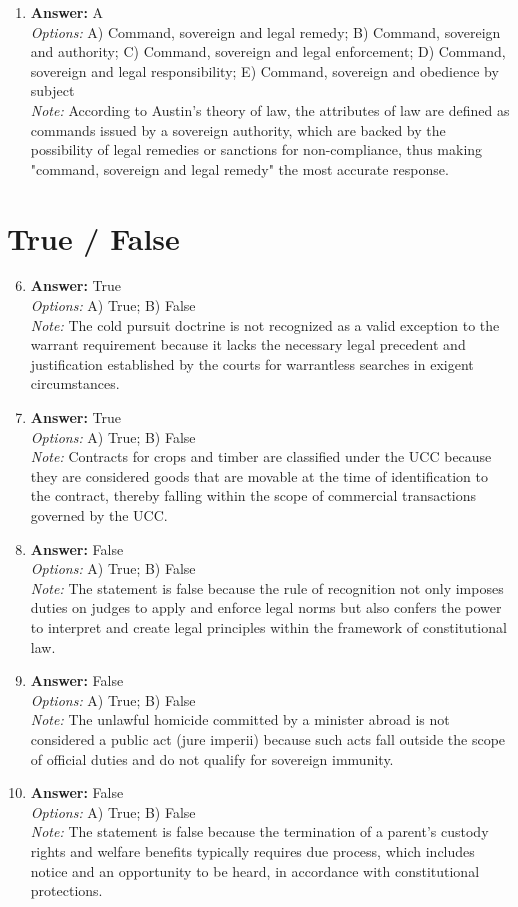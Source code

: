 \documentclass[12pt]{article}
\begin{document}
\begin{enumerate}[label=\arabic*.]
\item \textbf{Answer:} A
\\ \textit{Options:} A) Command, sovereign and legal remedy; B) Command, sovereign and authority; C) Command, sovereign and legal enforcement; D) Command, sovereign and legal responsibility; E) Command, sovereign and obedience by subject
\\ \textit{Note:} According to Austin's theory of law, the attributes of law are defined as commands issued by a sovereign authority, which are backed by the possibility of legal remedies or sanctions for non-compliance, thus making "command, sovereign and legal remedy" the most accurate response.
\end{enumerate}

\section*{True / False}
\begin{enumerate}[label=\arabic*.]
\setcounter{enumi}{5}
\item \textbf{Answer:} True
\\ \textit{Options:} A) True; B) False
\\ \textit{Note:} The cold pursuit doctrine is not recognized as a valid exception to the warrant requirement because it lacks the necessary legal precedent and justification established by the courts for warrantless searches in exigent circumstances.
\item \textbf{Answer:} True
\\ \textit{Options:} A) True; B) False
\\ \textit{Note:} Contracts for crops and timber are classified under the UCC because they are considered goods that are movable at the time of identification to the contract, thereby falling within the scope of commercial transactions governed by the UCC.
\item \textbf{Answer:} False
\\ \textit{Options:} A) True; B) False
\\ \textit{Note:} The statement is false because the rule of recognition not only imposes duties on judges to apply and enforce legal norms but also confers the power to interpret and create legal principles within the framework of constitutional law.
\item \textbf{Answer:} False
\\ \textit{Options:} A) True; B) False
\\ \textit{Note:} The unlawful homicide committed by a minister abroad is not considered a public act (jure imperii) because such acts fall outside the scope of official duties and do not qualify for sovereign immunity.
\item \textbf{Answer:} False
\\ \textit{Options:} A) True; B) False
\\ \textit{Note:} The statement is false because the termination of a parent's custody rights and welfare benefits typically requires due process, which includes notice and an opportunity to be heard, in accordance with constitutional protections.
\end{enumerate}
\end{document}

